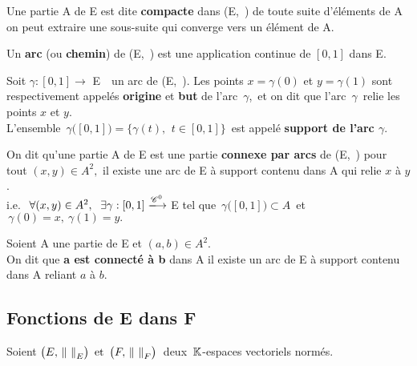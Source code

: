 \vspace{1.5cm}

Une partie A de E est dite \textbf{compacte} dans (E,\ \normtxt{\ }) \ssi de toute suite d'éléments de A on peut extraire une sous-suite qui converge vers un élément de A.

\vspace{1.5cm}

Un \textbf{arc} (ou \textbf{chemin}) de (E,\ \normtxt{\ }) est une application continue de \([0,1]\) dans E.

\vspace{0.3cm}

Soit \(\gamma  : [0,1] \to \) E\ \ un arc de (E,\ \normtxt{\ }). Les points \(x=\gamma(0)\) et \(y=\gamma(1)\) sont respectivement appelés \textbf{origine} et \textbf{but} de l'arc \(\,\gamma\), \,et on dit que l'arc \(\,\gamma\,\) relie les points \(x\) et \(y\).\vspace{0.1cm}\\
L'ensemble \(\,\gamma \bigl( [0,1] \bigr) = \{ \gamma(t),\ \,t\in [0,1] \} \,\) est appelé \textbf{support de l'arc \(\gamma\)}. 

\vspace{1.4cm}

On dit qu'une partie A de E est une partie \textbf{connexe par arcs} de (E,\ \normtxt{\ }) \ssi pour tout \((x,y)\in A^2,\) il existe une arc de E à support contenu dans A qui relie \(x\) à \(y\).\vspace{0.1cm}\\
i.e. \(\ \forall(x,y)\in A^2,\ \; \exists \gamma : [0,1] \xlongrightarrow{\mathscr{C}^0} \) E\; tel que \(\,\gamma \bigl( [0,1] \bigr) \subset A\,\) et \(\,\gamma(0)=x,\ \gamma(1)=y. \)
\vspace{1.6cm}

Soient A une partie de E et \((a,b)\in A^2\).\vspace{0.1cm}\\
On dit que \textbf{a est connecté à b} dans A \ssi il existe un arc de E à support contenu dans A reliant $a$ à $b$.

\newpage

\subsection{Fonctions de E dans F}

\vspace{0.8cm}
\begin{center}
    Soient \(\bigl(E,\, \norm{\ }_E\bigr)\,\text{ et }\, \bigl(F,\, \norm{\ }_F\bigr)\,\) deux $\,\mathbb{K}$-espaces vectoriels normés.
\end{center}
\vspace{0.8cm}

